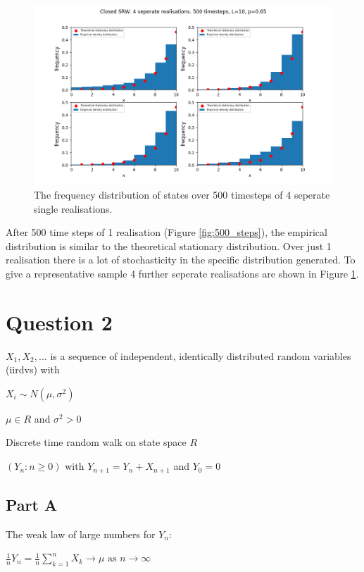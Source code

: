 \documentclass{article}
\begin{document}
\begin{figure}[H]
\includegraphics[scale=0.5]{500_steps_4_a.png} 
\caption{The frequency distribution of states over 500 timesteps of 4 seperate single realisations. }
\label{fig:500_steps_4}
\end{figure}

After 500 time steps of 1 realisation (Figure \ref{fig:500_steps}), the empirical distribution is similar to the theoretical stationary distribution. Over just 1 realisation there is a lot of stochasticity in the specific distribution generated. To give a representative sample 4 further seperate realisations are shown in Figure \ref{fig:500_steps_4}.


\section{Question 2}

$X_1, X_2, ... $ is a sequence of independent, identically distributed random variables (iirdvs) with 

$X_i \sim N(\mu, \sigma^2)$ 

$\mu \in {R}$ and $\sigma^2 > 0$

Discrete time random walk on state space ${R}$

$(Y_n : n \geq 0)$ with $Y_{n+1} = Y_n + X_{n+1}$ and $Y_0 = 0$


\subsection{Part A}

The weak law of large numbers for $Y_n$:

$\frac{1}{n}Y_n = \frac{1}{n}\sum\limits_{k=1}^n X_k \to \mu \text{ as } n \to \infty$
\end{document}

